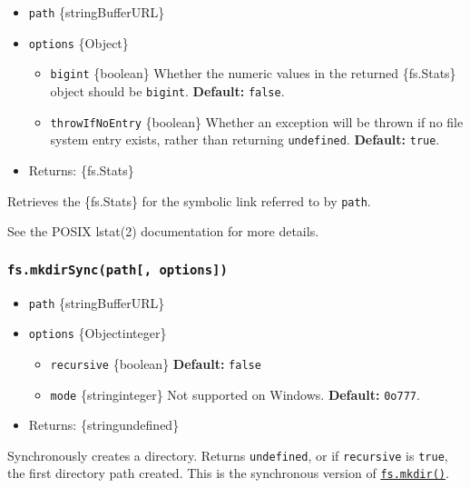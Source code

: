 \begin{itemize}
\tightlist
\item
  \texttt{path} \{string\textbar Buffer\textbar URL\}
\item
  \texttt{options} \{Object\}

  \begin{itemize}
  \tightlist
  \item
    \texttt{bigint} \{boolean\} Whether the numeric values in the
    returned \{fs.Stats\} object should be \texttt{bigint}.
    \textbf{Default:} \texttt{false}.
  \item
    \texttt{throwIfNoEntry} \{boolean\} Whether an exception will be
    thrown if no file system entry exists, rather than returning
    \texttt{undefined}. \textbf{Default:} \texttt{true}.
  \end{itemize}
\item
  Returns: \{fs.Stats\}
\end{itemize}

Retrieves the \{fs.Stats\} for the symbolic link referred to by
\texttt{path}.

See the POSIX lstat(2) documentation for more details.

\subsubsection{\texorpdfstring{\texttt{fs.mkdirSync(path{[},\ options{]})}}{fs.mkdirSync(path{[}, options{]})}}\label{fs.mkdirsyncpath-options}

\begin{itemize}
\tightlist
\item
  \texttt{path} \{string\textbar Buffer\textbar URL\}
\item
  \texttt{options} \{Object\textbar integer\}

  \begin{itemize}
  \tightlist
  \item
    \texttt{recursive} \{boolean\} \textbf{Default:} \texttt{false}
  \item
    \texttt{mode} \{string\textbar integer\} Not supported on Windows.
    \textbf{Default:} \texttt{0o777}.
  \end{itemize}
\item
  Returns: \{string\textbar undefined\}
\end{itemize}

Synchronously creates a directory. Returns \texttt{undefined}, or if
\texttt{recursive} is \texttt{true}, the first directory path created.
This is the synchronous version of
\hyperref[fsmkdirpath-options-callback]{\texttt{fs.mkdir()}}.

